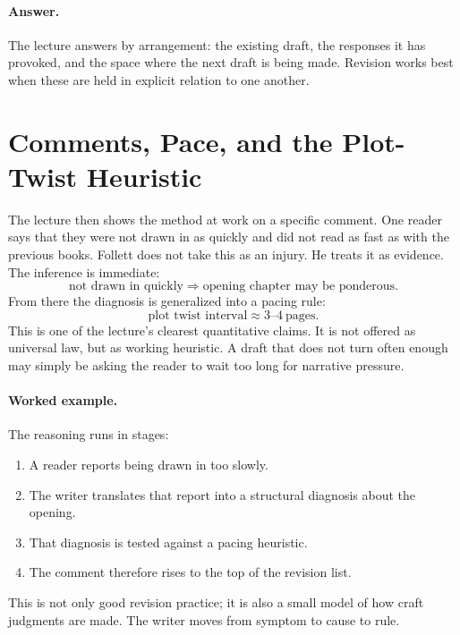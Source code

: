\paragraph{Answer.} The lecture answers by arrangement: the existing draft, the responses it has provoked, and the space where the next draft is being made. Revision works best when these are held in explicit relation to one another.

\section{Comments, Pace, and the Plot-Twist Heuristic}

The lecture then shows the method at work on a specific comment. One reader says that they were not drawn in as quickly and did not read as fast as with the previous books. Follett does not take this as an injury. He treats it as evidence. The inference is immediate:
\begin{equation}
\text{not drawn in quickly} \Rightarrow \text{opening chapter may be ponderous}.
\end{equation}
From there the diagnosis is generalized into a pacing rule:
\begin{equation}
\text{plot twist interval} \approx 3\text{--}4 \ \text{pages}.
\end{equation}
This is one of the lecture's clearest quantitative claims. It is not offered as universal law, but as working heuristic. A draft that does not turn often enough may simply be asking the reader to wait too long for narrative pressure.

\paragraph{Worked example.} The reasoning runs in stages:
\begin{enumerate}
\item A reader reports being drawn in too slowly.
\item The writer translates that report into a structural diagnosis about the opening.
\item That diagnosis is tested against a pacing heuristic.
\item The comment therefore rises to the top of the revision list.
\end{enumerate}
This is not only good revision practice; it is also a small model of how craft judgments are made. The writer moves from symptom to cause to rule.

